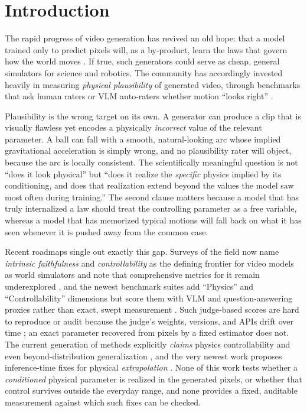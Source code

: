 \section{Introduction}

The rapid progress of video generation has revived an old hope: that a model
trained only to predict pixels will, as a by-product, learn the laws that
govern how the world moves \citep{brooks2024sora,agarwal2025cosmos}. If true,
such generators could serve as cheap, general simulators for science and
robotics. The community has accordingly invested heavily in measuring
\emph{physical plausibility} of generated video, through benchmarks that ask
human raters or VLM auto-raters whether motion ``looks right''
\citep{bansal2024videophy,bansal2025videophy2,meng2024phygenbench,motamed2025physicsiq,zhang2025morpheus,phyworldbench2025}.

Plausibility is the wrong target on its own. A generator can produce a clip
that is visually flawless yet encodes a physically \emph{incorrect} value of
the relevant parameter. A ball can fall with a smooth, natural-looking arc
whose implied gravitational acceleration is simply wrong, and no plausibility
rater will object, because the arc is locally consistent. The scientifically
meaningful question is not ``does it look physical'' but ``does it realize the
\emph{specific} physics implied by its conditioning, and does that realization
extend beyond the values the model saw most often during training.'' The
second clause matters because a model that has truly internalized a law should
treat the controlling parameter as a free variable, whereas a model that has
memorized typical motions will fall back on what it has seen whenever it is
pushed away from the common case.

Recent roadmaps single out exactly this gap. Surveys of the field now name
\emph{intrinsic faithfulness} and \emph{controllability} as the defining
frontier for video models as world simulators and note that comprehensive
metrics for it remain underexplored
\citep{roadmap2025visualworld,evolution2026videogen}, and the newest
benchmark suites add ``Physics'' and ``Controllability'' dimensions but score
them with VLM and question-answering proxies rather than exact, swept
measurement \citep{vbench2_2025,t2vphysbench2025,likephys2025}. Such judge-based
scores are hard to reproduce or audit because the judge's weights, versions, and
APIs drift over time \citep{phyground2026}; an exact parameter recovered from
pixels by a fixed estimator does not. The current generation of methods
explicitly \emph{claims} physics controllability and even
beyond-distribution generalization
\citep{physchoreo2025,phantom2026,physvideo2026,phyco2026,motionforcing2026}, and
the very newest work proposes inference-time fixes for physical
\emph{extrapolation} \citep{lapg2026}. None of this work tests whether a
\emph{conditioned} physical parameter is realized in the generated pixels, or
whether that control survives outside the everyday range, and none provides a
fixed, auditable measurement against which such fixes can be checked.

